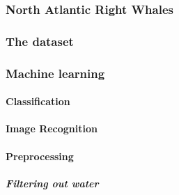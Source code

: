 \subsubsection{North Atlantic Right Whales}

\subsubsection{The dataset}


\subsubsection{Machine learning}
\paragraph{Classification}

\paragraph{Image Recognition}

\paragraph{Preprocessing}

\subparagraph{Filtering out water}
\subparagraph{}